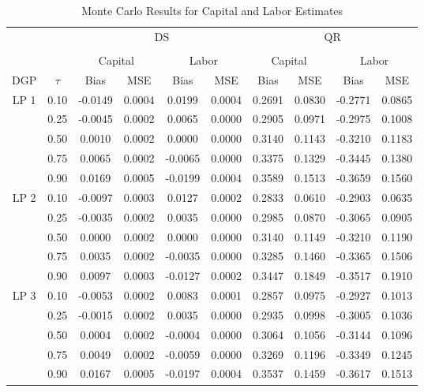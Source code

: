 \documentclass[12pt]{article}
\begin{document}
\begin{table}[H]
\centering
\caption{Monte Carlo Results for Capital and Labor Estimates}
\small
\begin{tabular}{cccccccccc}
  \hline\hline & & & \multicolumn{2}{c}{DS} & & & \multicolumn{2}{c}{QR} \\ \cmidrule(lr){3-6} \cmidrule(lr){7-10} \\ & & \multicolumn{2}{c}{Capital} & \multicolumn{2}{c}{Labor} & \multicolumn{2}{c}{Capital} & \multicolumn{2}{c}{Labor} \\ \cmidrule(lr){3-4} \cmidrule(lr){5-6} \cmidrule(lr){7-8} \cmidrule(lr){9-10}DGP & $\tau$ & Bias & MSE & Bias & MSE & Bias & MSE & Bias & MSE \\ 
  \hline
LP 1 & 0.10 & -0.0149 & 0.0004 & 0.0199 & 0.0004 & 0.2691 & 0.0830 & -0.2771 & 0.0865 \\ 
   & 0.25 & -0.0045 & 0.0002 & 0.0065 & 0.0000 & 0.2905 & 0.0971 & -0.2975 & 0.1008 \\ 
   & 0.50 & 0.0010 & 0.0002 & 0.0000 & 0.0000 & 0.3140 & 0.1143 & -0.3210 & 0.1183 \\ 
   & 0.75 & 0.0065 & 0.0002 & -0.0065 & 0.0000 & 0.3375 & 0.1329 & -0.3445 & 0.1380 \\ 
   & 0.90 & 0.0169 & 0.0005 & -0.0199 & 0.0004 & 0.3589 & 0.1513 & -0.3659 & 0.1560 \\ 
  LP 2 & 0.10 & -0.0097 & 0.0003 & 0.0127 & 0.0002 & 0.2833 & 0.0610 & -0.2903 & 0.0635 \\ 
   & 0.25 & -0.0035 & 0.0002 & 0.0035 & 0.0000 & 0.2985 & 0.0870 & -0.3065 & 0.0905 \\ 
   & 0.50 & 0.0000 & 0.0002 & 0.0000 & 0.0000 & 0.3140 & 0.1149 & -0.3210 & 0.1190 \\ 
   & 0.75 & 0.0035 & 0.0002 & -0.0035 & 0.0000 & 0.3285 & 0.1460 & -0.3365 & 0.1506 \\ 
   & 0.90 & 0.0097 & 0.0003 & -0.0127 & 0.0002 & 0.3447 & 0.1849 & -0.3517 & 0.1910 \\ 
  LP 3 & 0.10 & -0.0053 & 0.0002 & 0.0083 & 0.0001 & 0.2857 & 0.0975 & -0.2927 & 0.1013 \\ 
   & 0.25 & -0.0015 & 0.0002 & 0.0035 & 0.0000 & 0.2935 & 0.0998 & -0.3005 & 0.1036 \\ 
   & 0.50 & 0.0004 & 0.0002 & -0.0004 & 0.0000 & 0.3064 & 0.1056 & -0.3144 & 0.1096 \\ 
   & 0.75 & 0.0049 & 0.0002 & -0.0059 & 0.0000 & 0.3269 & 0.1196 & -0.3349 & 0.1245 \\ 
   & 0.90 & 0.0167 & 0.0005 & -0.0197 & 0.0004 & 0.3537 & 0.1459 & -0.3617 & 0.1513 \\ 

\end{tabular}
\end{table}
\end{document}

